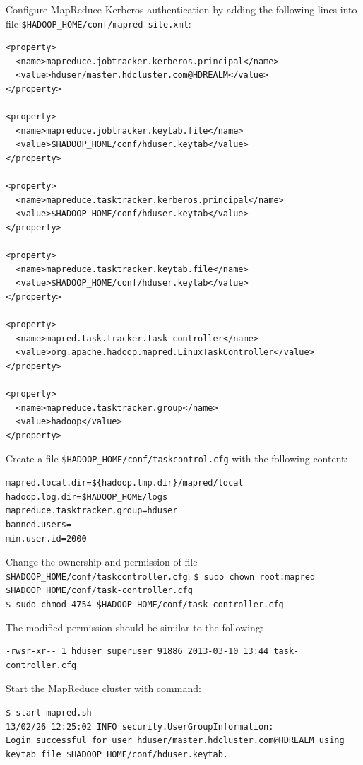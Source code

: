 Configure MapReduce Kerberos authentication by adding the following lines into file \verb|$HADOOP_HOME/conf/mapred-site.xml|:
\lstset{style=bashstyle}
\begin{lstlisting}
<property>
  <name>mapreduce.jobtracker.kerberos.principal</name>
  <value>hduser/master.hdcluster.com@HDREALM</value>
</property>

<property>
  <name>mapreduce.jobtracker.keytab.file</name>
  <value>$HADOOP_HOME/conf/hduser.keytab</value>
</property>

<property>
  <name>mapreduce.tasktracker.kerberos.principal</name>
  <value>$HADOOP_HOME/conf/hduser.keytab</value>
</property>

<property>
  <name>mapreduce.tasktracker.keytab.file</name>
  <value>$HADOOP_HOME/conf/hduser.keytab</value>
</property>

<property>
  <name>mapred.task.tracker.task-controller</name>
  <value>org.apache.hadoop.mapred.LinuxTaskController</value>
</property>

<property>
  <name>mapreduce.tasktracker.group</name>
  <value>hadoop</value>
</property>
\end{lstlisting}

Create a file \verb|$HADOOP_HOME/conf/taskcontrol.cfg| with the following content:
\lstset{style=bashstyle}
\begin{lstlisting}
mapred.local.dir=${hadoop.tmp.dir}/mapred/local
hadoop.log.dir=$HADOOP_HOME/logs
mapreduce.tasktracker.group=hduser
banned.users=
min.user.id=2000
\end{lstlisting}

Change the ownership and permission of file \verb|$HADOOP_HOME/conf/taskcontroller.cfg|:
\verb|$ sudo chown root:mapred $HADOOP_HOME/conf/task-controller.cfg| \\
\verb|$ sudo chmod 4754 $HADOOP_HOME/conf/task-controller.cfg|

The modified permission should be similar to the following:
\lstset{style=bashstyle}
\begin{lstlisting}
-rwsr-xr-- 1 hduser superuser 91886 2013-03-10 13:44 task-controller.cfg
\end{lstlisting}

Start the MapReduce cluster with command:
\lstset{style=bashstyle}
\begin{lstlisting}
$ start-mapred.sh
13/02/26 12:25:02 INFO security.UserGroupInformation:
Login successful for user hduser/master.hdcluster.com@HDREALM using keytab file $HADOOP_HOME/conf/hduser.keytab.
\end{lstlisting}

